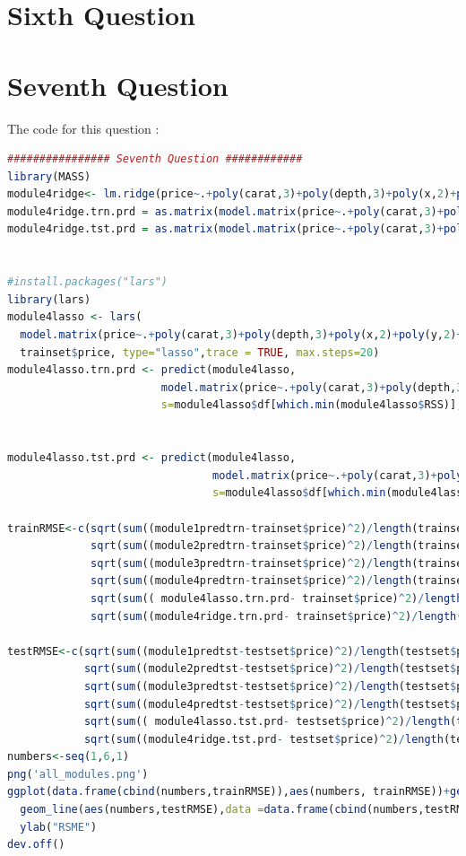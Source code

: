 \documentclass{article}
\begin{document}
\section*{Sixth Question}
\section*{Seventh Question} 

The code for this question :
\begin{lstlisting}[language=R]
################ Seventh Question ############
library(MASS)
module4ridge<- lm.ridge(price~.+poly(carat,3)+poly(depth,3)+poly(x,2)+poly(y,2)+poly(z,2)-carat-depth-x-y-z,data = trainset)
module4ridge.trn.prd = as.matrix(model.matrix(price~.+poly(carat,3)+poly(depth,3)+poly(x,2)+poly(y,2)+poly(z,2)-carat-depth-x-y-z,trainset))%*% coef(module4ridge)
module4ridge.tst.prd = as.matrix(model.matrix(price~.+poly(carat,3)+poly(depth,3)+poly(x,2)+poly(y,2)+poly(z,2)-carat-depth-x-y-z,testset))%*% coef(module4ridge)


#install.packages("lars")
library(lars)
module4lasso <- lars(
  model.matrix(price~.+poly(carat,3)+poly(depth,3)+poly(x,2)+poly(y,2)+poly(z,2)-carat-depth-x-y-z,trainset),
  trainset$price, type="lasso",trace = TRUE, max.steps=20)
module4lasso.trn.prd <- predict(module4lasso,
                        model.matrix(price~.+poly(carat,3)+poly(depth,3)+poly(x,2)+poly(y,2)+poly(z,2)-carat-depth-x-y-z,trainset),
                        s=module4lasso$df[which.min(module4lasso$RSS)], type="fit")$fit


module4lasso.tst.prd <- predict(module4lasso,
                                model.matrix(price~.+poly(carat,3)+poly(depth,3)+poly(x,2)+poly(y,2)+poly(z,2)-carat-depth-x-y-z,testset),
                                s=module4lasso$df[which.min(module4lasso$RSS)], type="fit")$fit

trainRMSE<-c(sqrt(sum((module1predtrn-trainset$price)^2)/length(trainset$price)),
             sqrt(sum((module2predtrn-trainset$price)^2)/length(trainset$price)),
             sqrt(sum((module3predtrn-trainset$price)^2)/length(trainset$price)),
             sqrt(sum((module4predtrn-trainset$price)^2)/length(trainset$price)),
             sqrt(sum(( module4lasso.trn.prd- trainset$price)^2)/length(trainset$price)),
             sqrt(sum((module4ridge.trn.prd- trainset$price)^2)/length(trainset$price)))

testRMSE<-c(sqrt(sum((module1predtst-testset$price)^2)/length(testset$price)),
            sqrt(sum((module2predtst-testset$price)^2)/length(testset$price)),
            sqrt(sum((module3predtst-testset$price)^2)/length(testset$price)),
            sqrt(sum((module4predtst-testset$price)^2)/length(testset$price)),
            sqrt(sum(( module4lasso.tst.prd- testset$price)^2)/length(testset$price)),
            sqrt(sum((module4ridge.tst.prd- testset$price)^2)/length(testset$price)))
numbers<-seq(1,6,1)
png('all_modules.png')
ggplot(data.frame(cbind(numbers,trainRMSE)),aes(numbers, trainRMSE))+geom_line(col="red") +
  geom_line(aes(numbers,testRMSE),data =data.frame(cbind(numbers,testRMSE)),col="blue" )+ xlab("Module")+
  ylab("RSME")
dev.off()
\end{lstlisting}
\end{document}
